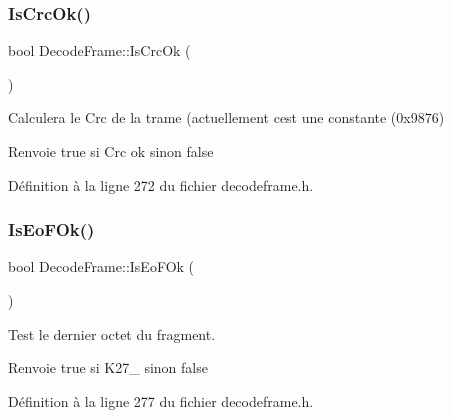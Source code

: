 \mbox{\label{class_decode_frame_a239ca7a7a2ffe98f2221137a6119139d}} 
\subsubsection{\texorpdfstring{Is\+Crc\+Ok()}{IsCrcOk()}}
{\footnotesize\ttfamily bool Decode\+Frame\+::\+Is\+Crc\+Ok (\begin{DoxyParamCaption}{ }\end{DoxyParamCaption})\hspace{0.3cm}{\ttfamily [inline]}}



Calculera le Crc de la trame (actuellement c\textquotesingle{}est une constante (0x9876) 

\begin{DoxyReturn}{Renvoie}
true si Crc ok sinon false 
\end{DoxyReturn}


Définition à la ligne 272 du fichier decodeframe.\+h.

\mbox{\label{class_decode_frame_aff3430f81b2b782784b06bfca9616d9f}} 
\subsubsection{\texorpdfstring{Is\+Eo\+F\+Ok()}{IsEoFOk()}}
{\footnotesize\ttfamily bool Decode\+Frame\+::\+Is\+Eo\+F\+Ok (\begin{DoxyParamCaption}{ }\end{DoxyParamCaption})\hspace{0.3cm}{\ttfamily [inline]}}



Test le dernier octet du fragment. 

\begin{DoxyReturn}{Renvoie}
true si K27\+\_ sinon false 
\end{DoxyReturn}


Définition à la ligne 277 du fichier decodeframe.\+h.

\mbox{\label{class_decode_frame_aa778340ea2650ce866f2aac9a59368d4}} 
